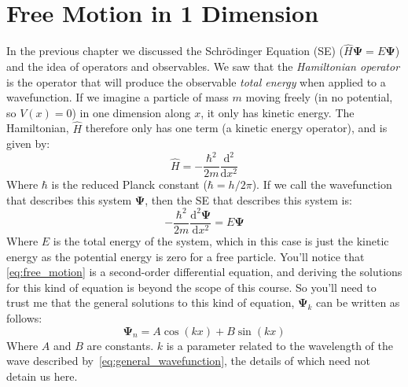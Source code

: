 \documentclass{memoir}[11pt,oneside,a4paper,openany]
\newcommand{\wf}{\ensuremath{\bm{\Psi}}\xspace}
\begin{document}
\section{Free Motion in 1 Dimension}
In the previous chapter we discussed the Schr{\"o}dinger Equation (SE) ($\hat{H}\wf = E\wf$) and the idea of operators and observables. We saw that the \emph{Hamiltonian operator} is the operator that will produce the observable \emph{total energy} when applied to a wavefunction. If we imagine a particle of mass $m$ moving freely (in no potential, so $V(x)=0$) in one dimension along $x$, it only has kinetic energy. The Hamiltonian, $\hat{H}$ therefore only has one term (a kinetic energy operator), and is given by:
\begin{equation}
	\hat{H} = -\frac{\hbar^2}{2m} \frac{\mathrm{d}^2}{\mathrm{d}x^2}
\end{equation}
Where $\hbar$ is the reduced Planck constant ($\hbar = h/2\pi$). If we call the wavefunction that describes this system \wf, then the SE that describes this system is:
\begin{equation}\label{eq:free_motion}
	-\frac{\hbar^2}{2m} \frac{\mathrm{d}^2\wf}{\mathrm{d}x^2} = E \wf
\end{equation}
Where $E$ is the total energy of the system, which in this case is just the kinetic energy as the potential energy is zero for a free particle. You'll notice that \autoref{eq:free_motion} is a second-order differential equation, and deriving the solutions for this kind of equation is beyond the scope of this course. So you'll need to trust me that the general solutions to this kind of equation, $\wf_k$ can be written as follows:
\begin{equation}\label{eq:general_wavefunction}
	\wf_n = A\cos(kx)+B\sin(kx)
\end{equation}
Where $A$ and $B$ are constants. $k$ is a parameter related to the wavelength of the wave described by~\autoref{eq:general_wavefunction}, the details of which need not detain us here.   
\end{document}
